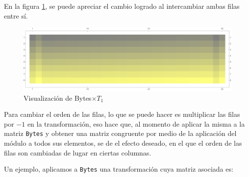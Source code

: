 \documentclass[a4paper]{article}
\begin{document}
En la figura \ref{fig:filasC2}, se puede apreciar el cambio logrado al intercambiar ambas filas entre sí.

\begin{figure}[H]
    \centering
    \includegraphics[width=\textwidth]{fila2}
    \caption{Visualización de Bytes$\times T_1$}
    \label{fig:filasC2}
\end{figure}


Para cambiar el orden de las filas, lo que se puede hacer es multiplicar las filas por $-1$ en la transformación, eso hace que, al momento de aplicar la misma a la matriz \texttt{Bytes} y obtener una matriz congruente por medio de la aplicación del módulo a todos sus elementos, se de el efecto deseado, en el que el orden de las filas son cambiadas de lugar en ciertas columnas.

Un ejemplo, aplicamos a \texttt{Bytes} una transformación cuya matriz asociada es:
\end{document}
